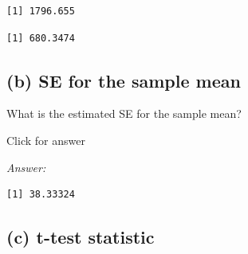 \documentclass[
]{book}
\newenvironment{Shaded}{\begin{snugshade}}{\end{snugshade}}
\newcommand{\FunctionTok}[1]{\textcolor[rgb]{0.00,0.00,0.00}{#1}}
\newcommand{\NormalTok}[1]{#1}
\newcommand{\OtherTok}[1]{\textcolor[rgb]{0.56,0.35,0.01}{#1}}
\newcommand{\SpecialCharTok}[1]{\textcolor[rgb]{0.00,0.00,0.00}{#1}}
\begin{document}
\begin{Shaded}
\end{Shaded}

\begin{verbatim}
[1] 1796.655
\end{verbatim}

\begin{Shaded}
\end{Shaded}

\begin{verbatim}
[1] 680.3474
\end{verbatim}

\hypertarget{b-se-for-the-sample-mean-1}{%
\subsection{(b) SE for the sample mean}\label{b-se-for-the-sample-mean-1}}

What is the estimated SE for the sample mean?

Click for answer

\emph{Answer:}

\begin{Shaded}
\end{Shaded}

\begin{verbatim}
[1] 38.33324
\end{verbatim}

\hypertarget{c-t-test-statistic-1}{%
\subsection{(c) t-test statistic}\label{c-t-test-statistic-1}}
\end{document}

